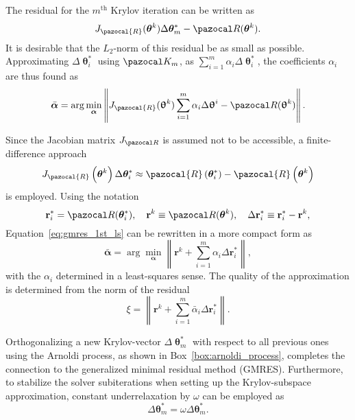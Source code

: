 The residual for the $m^\mathrm{th}$ Krylov iteration can be written as
\begin{equation}
J_\pazocal{R}(\boldsymbol \theta^k)\Delta\boldsymbol \theta^*_m - \pazocal R(\boldsymbol \theta^k).
\end{equation}
It is desirable that the $L_2$-norm of this residual be as small as possible.
Approximating $\Delta \bm \uptheta^*_i$ using $\pazocal K_m$, as $\sum_{i=1}^m \alpha_i \Delta \bm \uptheta^*_i$, the coefficients $\alpha_i$ are thus found as
\begin{equation} \label{eq:gmres_1st_ls}
\bar{\boldsymbol \alpha} = \arg\min_{\boldsymbol\alpha} \left\|J_\pazocal{R}(\bm \uptheta^k)\sum_{i=1}^m \alpha_i \Delta\bm \uptheta^i - \pazocal R(\bm \uptheta^k)\right\|.
\end{equation}

Since the Jacobian matrix $J_{\pazocal R}$ is assumed not to be accessible, a finite-difference approach
\begin{equation}
J_{\pazocal{R}}\left(\boldsymbol{\theta}^{k}\right) \Delta \boldsymbol{\theta}^*_{i} \approx \pazocal{R}\left(\boldsymbol{\theta}^*_{i}\right)-\pazocal{R}\left(\boldsymbol{\theta}^{k}\right)
\end{equation}
is employed.
Using the notation
\begin{equation}
\mathbf r^*_i = \pazocal R(\boldsymbol \theta^*_i),\quad
\mathbf r^k \equiv  \pazocal R(\boldsymbol \theta^k),\quad
\Delta \mathbf r_i^* \equiv \mathbf r_i^* - \mathbf r^k,
\end{equation}
Equation~\eqref{eq:gmres_1st_ls} can be rewritten in a more compact form as
\begin{equation} \label{eq:gmres_ls_condition}
\bar{\boldsymbol \alpha} = \arg\min_{\boldsymbol \alpha} \left\|\mathbf r^k+\sum_{i=1}^m\alpha_i\Delta\mathbf r^*_i\right\|,
\end{equation}
with the $\alpha_i$ determined in a least-squares sense.
The quality of the approximation is determined from the norm of the residual
\begin{equation} \label{eq:gmres_residual}
\xi=\left\|\boldsymbol{r}^{k}+\sum_{i=1}^{m} \bar{\alpha}_{i} \Delta \boldsymbol{r}^*_{i}\right\|.
\end{equation}

Orthogonalizing a new Krylov-vector $\Delta \bm{\uptheta}^*_{m}$ with respect to all previous ones using the Arnoldi process, as shown in Box~\ref{box:arnoldi_process}, completes the connection to the generalized minimal residual method (GMRES).
Furthermore, to stabilize the solver subiterations when setting up the Krylov-subspace approximation, constant underrelaxation by $\omega$ can be employed as
\begin{equation}
\Delta \boldsymbol{\theta}^*_{m}=\omega \Delta \boldsymbol{\theta}^*_{m}.
\end{equation}

